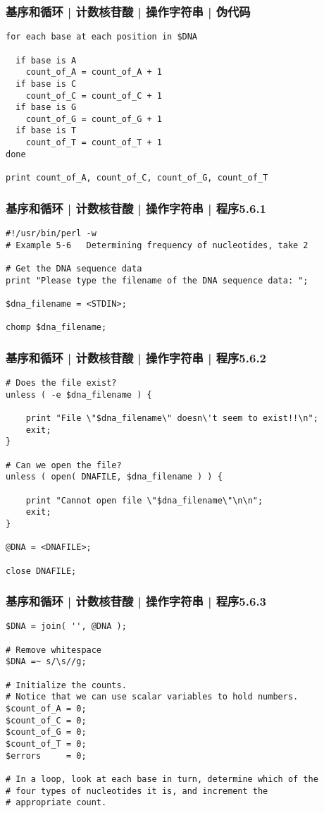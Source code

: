 \begin{frame}[fragile]
  \frametitle{基序和循环 | 计数核苷酸 | 操作字符串 | 伪代码}
\begin{lstlisting}
for each base at each position in $DNA

  if base is A
    count_of_A = count_of_A + 1
  if base is C
    count_of_C = count_of_C + 1
  if base is G
    count_of_G = count_of_G + 1
  if base is T
    count_of_T = count_of_T + 1
done

print count_of_A, count_of_C, count_of_G, count_of_T
\end{lstlisting}
\end{frame}

\begin{frame}[fragile]
  \frametitle{基序和循环 | 计数核苷酸 | 操作字符串 | 程序5.6.1}
\begin{lstlisting}[firstnumber=1]
#!/usr/bin/perl -w
# Example 5-6   Determining frequency of nucleotides, take 2

# Get the DNA sequence data
print "Please type the filename of the DNA sequence data: ";

$dna_filename = <STDIN>;

chomp $dna_filename;
\end{lstlisting}
\end{frame}

\begin{frame}[fragile]
  \frametitle{基序和循环 | 计数核苷酸 | 操作字符串 | 程序5.6.2}
\begin{lstlisting}[firstnumber=11,basicstyle=\footnotesize\tt,numberstyle=\scriptsize]
# Does the file exist?
unless ( -e $dna_filename ) {

    print "File \"$dna_filename\" doesn\'t seem to exist!!\n";
    exit;
}

# Can we open the file?
unless ( open( DNAFILE, $dna_filename ) ) {

    print "Cannot open file \"$dna_filename\"\n\n";
    exit;
}

@DNA = <DNAFILE>;

close DNAFILE;
\end{lstlisting}
\end{frame}

\begin{frame}[fragile]
  \frametitle{基序和循环 | 计数核苷酸 | 操作字符串 | 程序5.6.3}
\begin{lstlisting}[firstnumber=29,basicstyle=\footnotesize\tt,numberstyle=\scriptsize]
$DNA = join( '', @DNA );

# Remove whitespace
$DNA =~ s/\s//g;

# Initialize the counts.
# Notice that we can use scalar variables to hold numbers.
$count_of_A = 0;
$count_of_C = 0;
$count_of_G = 0;
$count_of_T = 0;
$errors     = 0;

# In a loop, look at each base in turn, determine which of the
# four types of nucleotides it is, and increment the
# appropriate count.
\end{lstlisting}
\end{frame}

